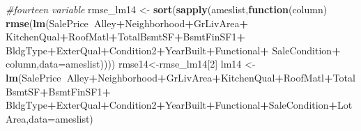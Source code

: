 \documentclass[]{article}
\newenvironment{Shaded}{\begin{snugshade}}{\end{snugshade}}
\newcommand{\CommentTok}[1]{\textcolor[rgb]{0.56,0.35,0.01}{\textit{#1}}}
\newcommand{\ControlFlowTok}[1]{\textcolor[rgb]{0.13,0.29,0.53}{\textbf{#1}}}
\newcommand{\DataTypeTok}[1]{\textcolor[rgb]{0.13,0.29,0.53}{#1}}
\newcommand{\DecValTok}[1]{\textcolor[rgb]{0.00,0.00,0.81}{#1}}
\newcommand{\KeywordTok}[1]{\textcolor[rgb]{0.13,0.29,0.53}{\textbf{#1}}}
\newcommand{\NormalTok}[1]{#1}
\newcommand{\OperatorTok}[1]{\textcolor[rgb]{0.81,0.36,0.00}{\textbf{#1}}}
\newcommand{\StringTok}[1]{\textcolor[rgb]{0.31,0.60,0.02}{#1}}
\begin{document}
\begin{Shaded}
\begin{Highlighting}[]
\CommentTok{#fourteen variable}
\NormalTok{rmse_lm14 <-}\StringTok{ }\KeywordTok{sort}\NormalTok{(}\KeywordTok{sapply}\NormalTok{(ameslist,}\ControlFlowTok{function}\NormalTok{(column) }\KeywordTok{rmse}\NormalTok{(}\KeywordTok{lm}\NormalTok{(SalePrice}\OperatorTok{~}\NormalTok{Alley}\OperatorTok{+}\NormalTok{Neighborhood}\OperatorTok{+}\NormalTok{GrLivArea}\OperatorTok{+}
\StringTok{                                                             }\NormalTok{KitchenQual}\OperatorTok{+}\NormalTok{RoofMatl}\OperatorTok{+}\NormalTok{TotalBsmtSF}\OperatorTok{+}\NormalTok{BsmtFinSF1}\OperatorTok{+}
\StringTok{                                                             }\NormalTok{BldgType}\OperatorTok{+}\NormalTok{ExterQual}\OperatorTok{+}\NormalTok{Condition2}\OperatorTok{+}\NormalTok{YearBuilt}\OperatorTok{+}\NormalTok{Functional}\OperatorTok{+}
\StringTok{                                                             }\NormalTok{SaleCondition}\OperatorTok{+}
\StringTok{                                                             }\NormalTok{column,}\DataTypeTok{data=}\NormalTok{ameslist))))}
\NormalTok{rmse14<-rmse_lm14[}\DecValTok{2}\NormalTok{]}
\NormalTok{lm14 <-}\StringTok{ }\KeywordTok{lm}\NormalTok{(SalePrice}\OperatorTok{~}\NormalTok{Alley}\OperatorTok{+}\NormalTok{Neighborhood}\OperatorTok{+}\NormalTok{GrLivArea}\OperatorTok{+}\NormalTok{KitchenQual}\OperatorTok{+}\NormalTok{RoofMatl}\OperatorTok{+}\NormalTok{TotalBsmtSF}\OperatorTok{+}\NormalTok{BsmtFinSF1}\OperatorTok{+}
\StringTok{             }\NormalTok{BldgType}\OperatorTok{+}\NormalTok{ExterQual}\OperatorTok{+}\NormalTok{Condition2}\OperatorTok{+}\NormalTok{YearBuilt}\OperatorTok{+}\NormalTok{Functional}\OperatorTok{+}\NormalTok{SaleCondition}\OperatorTok{+}\NormalTok{LotArea,}\DataTypeTok{data=}\NormalTok{ameslist)}


\end{Highlighting}
\end{Shaded}
\end{document}
